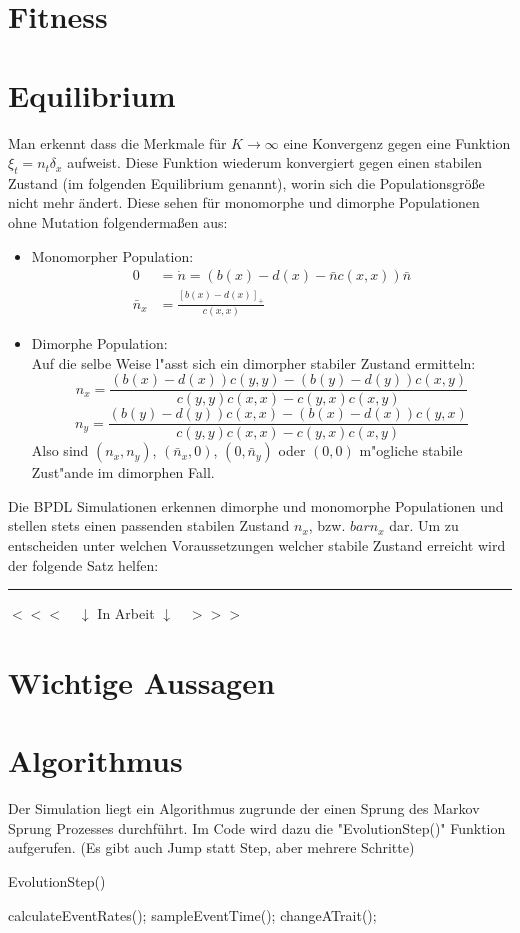 \documentclass[11pt, a4paper, german]{article}
\begin{document}
	
\clearpage
\section{Fitness}
\section{Equilibrium}
Man erkennt dass die Merkmale für $ K \to \infty $ eine Konvergenz gegen eine Funktion $ \xi_t = n_t \delta_x $ aufweist. Diese Funktion wiederum konvergiert gegen einen stabilen Zustand (im folgenden Equilibrium genannt), worin sich die Populationsgröße nicht mehr ändert. Diese sehen für monomorphe und dimorphe Populationen ohne Mutation folgendermaßen aus:
\begin{itemize}
	\item Monomorpher Population:\\
		\begin{align*}
		0 & = \dot{n} = (b(x) - d(x) - \bar{n}c(x,x))\bar{n}\\
		\bar{n}_x &= \frac{\left[ b(x)-d(x) \right]_+}{c(x,x)}
		\end{align*}
	\item Dimorphe Population:\\
		Auf die selbe Weise l"asst sich ein dimorpher stabiler Zustand ermitteln:
		\[ n_x = \frac{(b(x) - d(x))c(y,y)-(b(y)-d(y))c(x,y)}{c(y,y)c(x,x) - c(y,x)c(x,y)} \]
		\[ n_y = \frac{(b(y) - d(y))c(x,x)-(b(x)-d(x))c(y,x)}{c(y,y)c(x,x) - c(y,x)c(x,y)} \]
		Also sind $ (n_x, n_y) $, $ (\bar{n}_x, 0)$, $ (0, \bar{n}_y)$ oder $ (0,0) $ m"ogliche stabile Zust"ande im dimorphen Fall.
\end{itemize}
Die BPDL Simulationen erkennen dimorphe und monomorphe Populationen und stellen stets einen passenden stabilen Zustand $ n_x $, bzw. $ bar{n}_x $ dar. Um zu entscheiden unter welchen Voraussetzungen welcher stabile Zustand erreicht wird der folgende Satz helfen:


\clearpage

\noindent\rule{\textwidth}{2pt}
\begin{center}
	$ <<< \quad \downarrow $ In Arbeit $ \downarrow \quad >>> $
\end{center}

\section{Wichtige Aussagen}
	
\section{Algorithmus}
	Der Simulation liegt ein Algorithmus zugrunde der einen Sprung des Markov Sprung Prozesses durchführt. Im Code wird dazu die "{}EvolutionStep()"{} Funktion aufgerufen. (Es gibt auch Jump statt Step, aber mehrere Schritte)
	\begin{algorithm}[H]
		\caption{EvolutionStep()}
		\begin{algorithmic}[1]
			\STATE calculateEventRates();
			\STATE sampleEventTime();
			\STATE changeATrait();
		\end{algorithmic}
	\end{algorithm}
	
\end{document}
